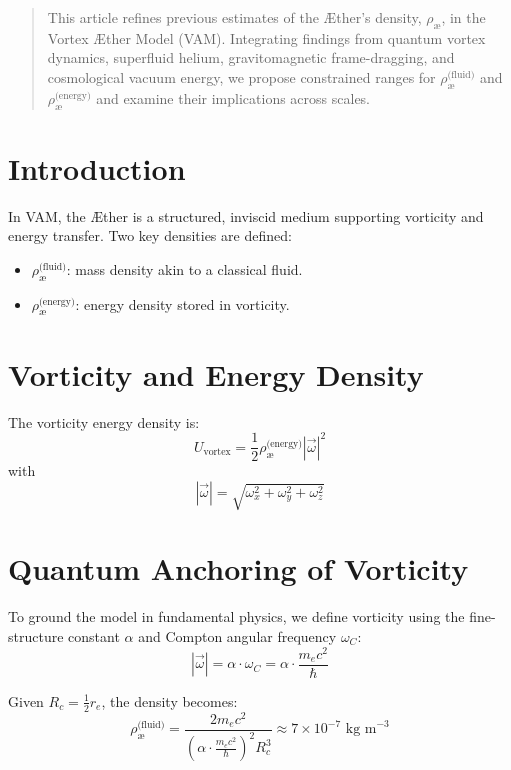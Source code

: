 \documentclass[12pt]{article}
\begin{document}
  \titlepageOpen

  \begin{abstract}
      This article refines previous estimates of the Æther's density, $\rho_{\text{\ae}}$, in the Vortex Æther Model (VAM). Integrating findings from quantum vortex dynamics, superfluid helium, gravitomagnetic frame-dragging, and cosmological vacuum energy, we propose constrained ranges for $\rho_{\text{\ae}}^{\text{(fluid)}}$ and $\rho_{\text{\ae}}^{\text{(energy)}}$ and examine their implications across scales.
  \end{abstract}

  \titlepageClose
\fi


\section{Introduction}

In VAM, the Æther is a structured, inviscid medium supporting vorticity and energy transfer. Two key densities are defined:
\begin{itemize}
    \item $\rho_{\text{\ae}}^{\text{(fluid)}}$: mass density akin to a classical fluid.
    \item $\rho_{\text{\ae}}^{\text{(energy)}}$: energy density stored in vorticity.
\end{itemize}

\section{Vorticity and Energy Density}

The vorticity energy density is:
\[
U_{\text{vortex}} = \frac{1}{2} \rho_{\text{\ae}}^{\text{(energy)}} |\vec{\omega}|^2
\]
with
\[
|\vec{\omega}| = \sqrt{\omega_x^2 + \omega_y^2 + \omega_z^2}
\]

\section{Quantum Anchoring of Vorticity}

To ground the model in fundamental physics, we define vorticity using the fine-structure constant $\alpha$ and Compton angular frequency $\omega_C$:
\[
|\vec{\omega}| = \alpha \cdot \omega_C = \alpha \cdot \frac{m_e c^2}{\hbar}
\]

Given $R_c = \frac{1}{2} r_e$, the density becomes:
\[
\rho_{\text{\ae}}^{\text{(fluid)}} = \frac{2 m_e c^2}{\left(\alpha \cdot \frac{m_e c^2}{\hbar}\right)^2 R_c^3} \approx 7 \times 10^{-7} \text{ kg m}^{-3}
\]
\end{document}
